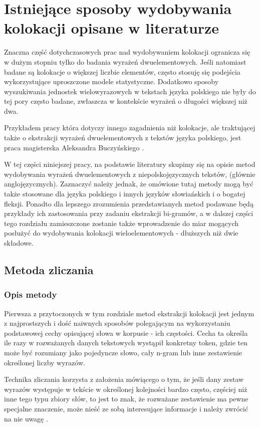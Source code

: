 \chapter{Istniejące sposoby wydobywania kolokacji opisane w literaturze}
Znaczna część dotychczasowych prac nad wydobywaniem kolokacji ogranicza się w dużym stopniu tylko do badania wyrażeń dwuelementowych.
Jeśli natomiast badane są kolokacje o większej liczbie elementów, często stosuję się podejścia wykorzystujące uproszczone modele statystyczne.
Dodatkowo sposoby wyszukiwania jednostek wielowyrazowych w tekstach języka polskiego nie były do tej pory często badane, zwłaszcza w kontekście wyrażeń o długości większej niż dwa.
\par
Przykładem pracy która dotyczy innego zagadnienia niż kolokacje, ale traktującej także o ekstrakcji wyrażeń dwuelementowych z tekstów języka polskiego, jest praca magisterska Aleksandra Buczyńskiego \cite{buczynski}.
\par
W tej części niniejszej pracy, na podstawie literatury skupimy się na opisie metod wydobywania wyrażeń dwuelementowych z niepolskojęzycznych tekstów, (głównie anglojęzycznych).
Zaznaczyć należy jednak, że omówione tutaj metody mogą być także stosowane dla języka polskiego i innych języków słowiańskich i o bogatej fleksji.
Ponadto dla lepszego zrozumienia przedstawianych metod podawane będą przykłady ich zastosowania przy zadaniu ekstrakcji bi-gramów, a w dalszej części tego rozdziału zamieszczone zostanie także wprowadzenie do miar mogących posłużyć do wydobywania kolokacji wieloelementowych - dłuższych niż dwie składowe.


\section{Metoda zliczania}

\subsection{Opis metody}
Pierwsza z przytoczonych w tym rozdziale metod ekstrakcji kolokacji jest jednym z najprostszych i dość naiwnych sposobów polegającym na wykorzystaniu podstawowej cechy opisującej słowa w korpusie - ich częstości.
Cecha ta określa ile razy w rozważanych danych tekstowych wystąpił konkretny token, gdzie ten może być rozumiany jako pojedyncze słowo, cały n-gram lub inne zestawienie określonej liczby wyrazów.

\par
Technika zliczania korzysta z założenia mówiącego o tym, że jeśli dany zestaw wyrazów występuje w tekście w określonej kolejności bardzo często, częściej niż inne tego typu zbiory słów, to jest to znak, że rozważane zestawienie ma pewne specjalne znaczenie, może nieść ze sobą interesujące informacje i należy zwrócić na nie uwagę \cite[str. 153]{mit}.

